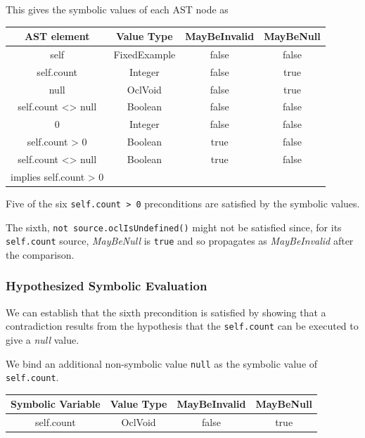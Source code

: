 \documentclass[
]{ceurart}
\begin{document}
This gives the symbolic values of each AST node as

\begin{center}
	\begin{tabular}{|c||c|c|c|}
		\hline
		AST element & Value Type & MayBeInvalid & MayBeNull \\
		\hline
		\hline
		self & FixedExample & false & false \\
		\hline
		self.count & Integer & false & true\\
		\hline
		null & OclVoid & false & true \\ 
		\hline
		self.count <> null & Boolean & false & false \\
		\hline
		0 & Integer & false & false \\
		\hline
		self.count > 0 & Boolean & true & false \\
		\hline
		self.count <> null & Boolean & true & false \\
		implies self.count > 0 & & & \\
		\hline
	\end{tabular}
\end{center}

Five of the six \verb|self.count > 0| preconditions are satisfied by the symbolic values.

The sixth, \verb|not source.oclIsUndefined()| might not be satisfied since, for its \verb|self.count| source, \emph{MayBeNull} is \verb|true| and so propagates as \emph{MayBeInvalid} after the comparison.

\subsubsection{Hypothesized Symbolic Evaluation}

We can establish that the sixth precondition is satisfied by showing that a contradiction results from the hypothesis that the \verb|self.count| can be executed to give a \emph{null} value. 

We bind an additional non-symbolic value \verb|null| as the symbolic value of \verb|self.count|.

\begin{center}
	\begin{tabular}{|c||c|c||c|}
		\hline
		Symbolic Variable & Value Type & MayBeInvalid & MayBeNull \\
		\hline
		self.count & OclVoid & false & true \\
		\hline
	\end{tabular}
\end{center} 
\end{document}
